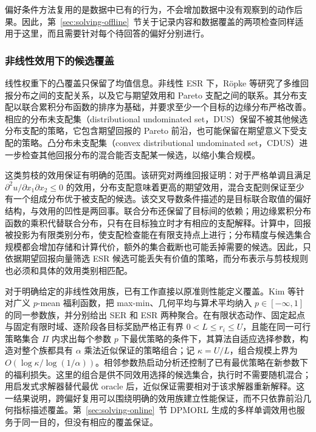 偏好条件方法复用的是数据中已有的行为，不会增加数据中没有观察到的动作后果。因此，第~\ref{sec:solving-offline}~节关于记录内容和数据覆盖的两项检查同样适用于这里，而且需要针对每个待回答的偏好分别进行。

\subsubsection{非线性效用下的候选覆盖}

线性权重下的凸覆盖只保留了均值信息。非线性 ESR 下，Röpke 等研究了多维回报分布之间的支配关系，以及它与期望效用和 Pareto 支配之间的联系\cite{ropke2023}。其分布支配以联合累积分布函数的排序为基础，并要求至少一个目标的边缘分布严格改善。相应的分布未支配集（distributional undominated set，DUS）保留不被其他候选分布支配的策略，它包含期望回报的 Pareto 前沿，也可能保留在期望意义下受支配的策略。凸分布未支配集（convex distributional undominated set，CDUS）进一步检查其他回报分布的混合能否支配某一候选，以缩小集合规模。

这类剪枝的效用保证有明确的范围。该研究对两维回报证明：对于严格单调且满足 $\partial^2u/\partial x_1\partial x_2\leq0$ 的效用，分布支配意味着更高的期望效用，混合支配则保证至少有一个组成分布优于被支配的候选。该交叉导数条件描述的是目标联合取值的偏好结构，与效用的凹性是两回事。联合分布还保留了目标间的依赖；用边缘累积分布函数的乘积代替联合分布，只有在目标独立时才有相应的支配解释。计算中，回报被投影为有限类别分布，使支配检查能在有限支持点上进行；分布精度与候选集合规模都会增加存储和计算代价，额外的集合截断也可能丢掉需要的候选\cite{ropke2023}。因此，只依据期望回报向量筛选 ESR 候选可能丢失有价值的策略，而分布表示与剪枝规则也必须和具体的效用类别相匹配。

对于明确给定的非线性效用族，已有工作直接以原准则性能定义覆盖。Kim 等针对广义 $p$-mean 福利函数，把 max-min、几何平均与算术平均纳入 $p\in[-\infty,1]$ 的同一参数族，并分别给出 SER 和 ESR 两种聚合\cite{kim2025portfolio}。在有限状态动作、固定起点与固定有限时域、逐阶段各目标奖励严格正有界 $0<L\leq r_i\leq U$，且能在同一可行策略集合 $\Pi$ 内求出每个参数 $p$ 下最优策略的条件下，其算法自适应选择参数，构造对整个族都具有 $\alpha$ 乘法近似保证的策略组合；记 $\kappa=U/L$，组合规模上界为 $O(\log\kappa/\log(1/\alpha))$。相邻参数热启动分析还控制了已有最优策略在新参数下的福利损失。这里的组合是供不同效用选择的候选集合，执行时不需要随机混合；用启发式求解器替代最优 oracle 后，近似保证需要相对于该求解器重新解释。这一结果说明，跨偏好复用可以围绕明确的效用族建立性能保证，而不只依靠前沿几何指标描述覆盖。第~\ref{sec:solving-online}~节 DPMORL 生成的多样单调效用也服务于同一目的，但没有相应的覆盖保证。

